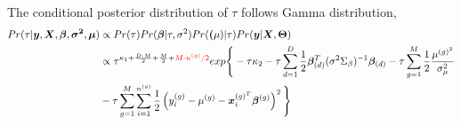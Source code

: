 \documentclass[paper=a4, fontsize=11pt]{scrartcl}
\numberwithin{equation}{section}		%
\numberwithin{figure}{section}			%
\numberwithin{table}{section}				%
\begin{document}
The conditional posterior distribution of $\tau$ follows Gamma distribution,
\begin{equation}
  \begin{aligned}
    Pr(\tau|\bm{y},\bm{X},\bm{\beta},\bm{\sigma^2},\bm{\mu})
    & \propto Pr(\tau)Pr(\bm{\beta}|\tau,\sigma^{2})Pr(\bm(\mu)|\tau)
    Pr(\bm{y}|\bm{X},\bm{\Theta})\\
    & \propto \tau^{\kappa_1+\frac{D\cdot M}{2}+\frac{M}{2}+{\color[rgb]{1,0,0} M\cdot n^{(g)}/2}}exp\Bigg\{-\tau\kappa_2-\tau\sum_{d=1}^{D}\frac{1}{2}
    \bm{\beta}_{(d)}^T(\sigma^2\Sigma_{\beta})^{-1}\bm{\beta}_{(d)}
    -\tau\sum_{g=1}^M\frac{1}{2}\frac{\mu^{(g)^2}}{\sigma_{\mu}^2}\\
    & - \tau\sum_{g=1}^{M}\sum_{i=1}^{n^{(g)}}\frac{1}{2}\left(y_{i}^{(g)}-\mu^{(g)}
    -\bm{x}^{(g)^T}_i\bm{\beta}^{(g)}\right)^2\Bigg\}
  \end{aligned}
\end{equation}
\end{document}
